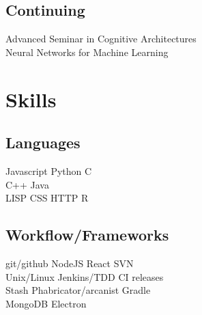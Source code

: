 \documentclass[]{csaund_resume-openfont}
\begin{document}
\begin{minipage}[t]{0.30\textwidth}
\subsection{Continuing}
Advanced Seminar in Cognitive Architectures \\
Neural Networks for Machine Learning 


\section{Skills}
\subsection{Languages}
Javascript \textbullet{} Python \textbullet{} C \\
C++ \textbullet{} Java  \\
LISP \textbullet{} CSS \textbullet{} HTTP \textbullet{} R \\
\vspace{\topsep} %
\subsection{Workflow/Frameworks}
git/github \textbullet{} NodeJS  \textbullet{} React \textbullet{} SVN \textbullet{} \\
 Unix/Linux \textbullet{} Jenkins/TDD \textbullet{} CI releases \\
 Stash \textbullet{} Phabricator/arcanist \textbullet{} Gradle \\
 MongoDB \textbullet{} Electron 
\sectionsep

%
%

\end{minipage}
\hfill
\end{document}
